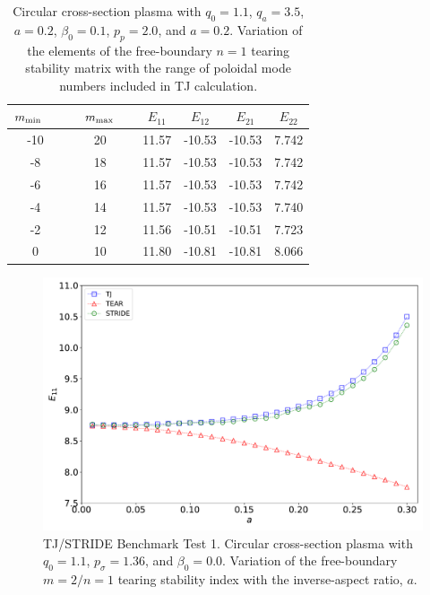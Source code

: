 \documentclass[12pt,prb,aps]{revtex4-1}
\begin{document}
\newpage
\begin{table}
\begin{tabular}{cccccc}\hline
$m_{\rm min}$~~ & ~~$m_{\rm max}$~~ & $E_{11}$ & $E_{12}$ & $E_{21}$ & $E_{22}$\\ \hline
-10  &20	      &11.57 &-10.53 &-10.53  &7.742 \\
-8   &18	      &11.57 &-10.53 &-10.53  &7.742 \\
-6   &16	      &11.57 &-10.53 &-10.53  &7.742 \\
-4   &14	      &11.57 &-10.53 &-10.53  &7.740 \\
-2   &12	      &11.56 &-10.51 &-10.51  &7.723 \\
 0   &10	      &11.80 &-10.81 &-10.81  &8.066 \\
\hline
\end{tabular}
\caption{Circular cross-section plasma with  $q_0=1.1$, $q_a=3.5$, $a=0.2$,  $\beta_0=0.1$, $p_p =2.0$,  and $a=0.2$.  Variation of the elements of the free-boundary $n=1$ tearing stability matrix with the 
range of poloidal mode numbers included in TJ calculation.}\label{t0}
\end{table}

\newpage
\begin{figure}
\centerline{\includegraphics[width=\textwidth]{Fig1.pdf}}
\caption{TJ/STRIDE Benchmark Test 1. Circular cross-section plasma with  $q_0=1.1$, $p_\sigma=1.36$,  and $\beta_0=0.0$. Variation of the  free-boundary $m=2/n=1$ tearing stability index with the inverse-aspect ratio, $a$. \label{fig1}}
\end{figure}
\end{document}
